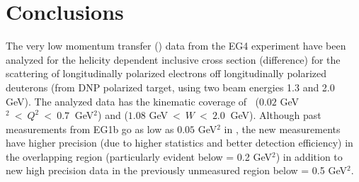 \clearpage
%
\chapter{Conclusions}
\label{cha:conclusions}




\hspace{0.5cm}


The very low momentum transfer (\qsq) data from the EG4 experiment have been analyzed for the helicity 
dependent inclusive cross section (difference) for the scattering of longitudinally polarized 
electrons off longitudinally polarized deuterons (from DNP polarized  target, using two beam energies 1.3 and 2.0 GeV). %
 The analyzed data has the kinematic coverage of $~$ ($0.02$ GeV$^2 ~ \lt ~Q^2 ~ \lt ~ 0.7 ~$ GeV$^2$) and ($1.08$ GeV$ ~ \lt ~W ~ \lt ~ 2.0 ~$ GeV). Although past measurements from EG1b go as low as $0.05$ GeV$^2$ in \qsq, the new measurements have higher precision (due to higher statistics and better detection efficiency) in the overlapping region (particularly evident below \qsq = 0.2 GeV$^2$) in addition to new high precision data in the previously unmeasured region below \qsqs = 0.5 GeV$^2$. %


